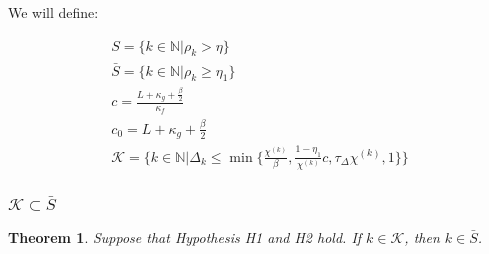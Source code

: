 \documentclass{article}
\newtheorem{theorem}{Theorem}[section]
\theoremstyle{case}
\newcommand{\modelk}{{{m}_f}^{(k)}}
\newcommand{\iteratek}{{x}^{(k)}}
\newcommand{\trialk}{{{s}^{(k)}}}
\newcommand{\chik}{{\chi^{(k)}}}
\newcommand{\ints}{\mathbb N}
\newcommand{\dk}{\Delta_k}
\newcommand{\rk}{\rho_k}
\newcommand{\gk}{{\nabla m_f^{(k)}(x^{(k)})}}
\newcommand{\oalpha}{\tau_{\Delta}}
\newcommand{\hk}{{\nabla^2m_f^{(k)}(x^{(k)})}}
\begin{document}
We will define:


\begin{align*}
S = \{k \in \ints | \rk > \eta \} \\
\bar{S} = \{k \in \ints | \rk \ge \eta_1 \} \\
c = \frac{L + \kappa_{g} + \frac {\beta} 2}{\kappa_f} \\
c_0 = L + \kappa_{g} + \frac {\beta} 2 \\
\mathcal K = \big \{ k \in \ints | \dk \le \min \{ \frac {\chik}{\beta}, \frac{1-\eta_1}{\chik}c, \oalpha \chik, 1 \} \big \}
\end{align*}



\subsubsection{$\mathcal K \subset \bar{S}$}
\begin{theorem}
Suppose that Hypothesis H1 and H2 hold. If $k \in \mathcal K$, then $k \in \bar{S}$.
\end{theorem}
 
\end{document}
